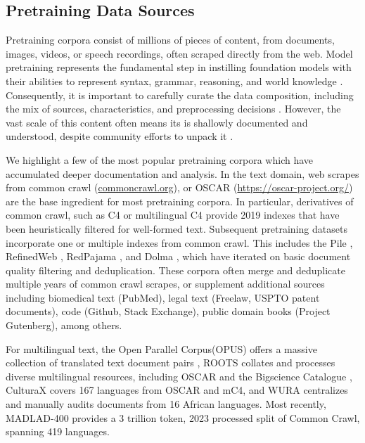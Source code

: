 \subsection{Pretraining Data Sources}

% 

Pretraining corpora consist of millions of pieces of content, from documents, images, videos, or speech recordings, often scraped directly from the web.
Model pretraining represents the fundamental step in instilling foundation models with their abilities to represent syntax, grammar, reasoning, and world knowledge \citep{devlin2018bert, browngpt3, chowdhery2023palm}.
Consequently, it is important to carefully curate the data composition, including the mix of sources, characteristics, and preprocessing decisions \citep{longpre2023data}.
However, the vast scale of this content often means its is shallowly documented and understood, despite community efforts to unpack it \citep{dodge2021documenting, elazar2023whats}.

We highlight a few of the most popular pretraining corpora which have accumulated deeper documentation and analysis.
In the text domain, web scrapes from common crawl (\url{commoncrawl.org}), or OSCAR (\url{https://oscar-project.org/}) \citep{suarez2019asynchronous, laippala2022towards} are the base ingredient for most pretraining corpora.
In particular, derivatives of common crawl, such as C4 \citep{raffel2020exploring,dodge2021documenting} or multilingual C4 \citep{kreutzer2022quality} provide 2019 indexes that have been heuristically filtered for well-formed text.
Subsequent pretraining datasets incorporate one or multiple indexes from common crawl.
This includes the Pile \citep{gao2020pile}, RefinedWeb \citep{penedo2023refinedweb}, RedPajama \citep{together_ai_2023_redpajama}, and Dolma \citep{soldaini2024dolma}, which have iterated on basic document quality filtering and deduplication.
These corpora often merge and deduplicate multiple years of common crawl scrapes, or supplement additional sources including biomedical text (PubMed), legal text (Freelaw, USPTO patent documents), code (Github, Stack Exchange), public domain books (Project Gutenberg), among others.

For multilingual text, the Open Parallel Corpus(OPUS) offers a massive collection of translated text document pairs \citep{tiedemann2012parallel}, ROOTS \citep{NEURIPS2022_ce9e92e3} collates and processes diverse multilingual resources, including OSCAR \citep{laippala2022towards} and the Bigscience Catalogue \citep{mcmillan2022documenting}, CulturaX \citep{nguyen2023culturax} covers 167 languages from OSCAR and mC4, and WURA \citep{oladipo-etal-2023-better} centralizes and manually audits documents from 16 African languages.
Most recently, MADLAD-400 \citep{kudugunta2023madlad} provides a 3 trillion token, 2023 processed split of Common Crawl, spanning 419 languages.

